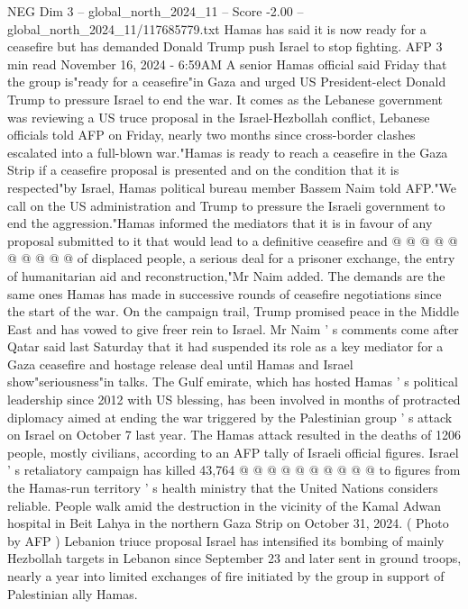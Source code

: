 \begin{textsample}{NEG Dim 3 – global\_north\_2024\_11 – Score -2.00 – global\_north\_2024\_11/117685779.txt}  \label{ex:f3_neg_275}
Hamas has said it is now ready for a ceasefire but has demanded Donald Trump push Israel to stop fighting.
AFP 3 min read November 16, 2024 - 6:59AM A senior Hamas official said Friday that the group is"ready for a ceasefire"in Gaza and urged US President-elect Donald Trump to pressure Israel to end the war.
It comes as the Lebanese government was reviewing a US truce proposal in the Israel-Hezbollah conflict, Lebanese officials told AFP on Friday, nearly two months since cross-border clashes escalated into a full-blown war."Hamas is ready to reach a ceasefire in the Gaza Strip if a ceasefire proposal is presented and on the condition that it is respected"by Israel, Hamas political bureau member Bassem Naim told AFP."We call on the US administration and Trump to pressure the Israeli government to end the aggression."Hamas informed the mediators that it is in favour of any proposal submitted to it that would lead to a definitive ceasefire and @ @ @ @ @ @ @ @ @ @ of displaced people, a serious deal for a prisoner exchange, the entry of humanitarian aid and reconstruction,"Mr Naim added.
The demands are the same ones Hamas has made in successive rounds of ceasefire negotiations since the start of the war.
On the campaign trail, Trump promised peace in the Middle East and has vowed to give freer rein to Israel.
Mr Naim ' s comments come after Qatar said last Saturday that it had suspended its role as a key mediator for a Gaza ceasefire and hostage release deal until Hamas and Israel show"seriousness"in talks.
The Gulf emirate, which has hosted Hamas ' s political leadership since 2012 with US blessing, has been involved in months of protracted diplomacy aimed at ending the war triggered by the Palestinian group ' s attack on Israel on October 7 last year.
The Hamas attack resulted in the deaths of 1206 people, mostly civilians, according to an AFP tally of Israeli official figures.
Israel ' s retaliatory campaign has killed 43,764 @ @ @ @ @ @ @ @ @ @ to figures from the Hamas-run territory ' s health ministry that the United Nations considers reliable.
People walk amid the destruction in the vicinity of the Kamal Adwan hospital in Beit Lahya in the northern Gaza Strip on October 31, 2024. ( Photo by AFP ) Lebanion triuce proposal Israel has intensified its bombing of mainly Hezbollah targets in Lebanon since September 23 and later sent in ground troops, nearly a year into limited exchanges of fire initiated by the group in support of Palestinian ally Hamas.

\end{textsample}

